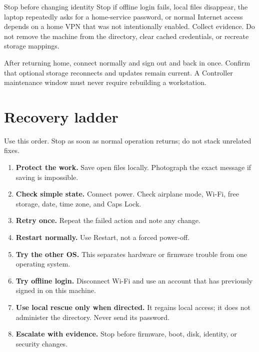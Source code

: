 
\begin{gate}{Stop before changing identity}
Stop if offline login fails, local files disappear, the laptop repeatedly
asks for a home-service password, or normal Internet access depends on a home
VPN that was not intentionally enabled. Collect evidence. Do not remove the
machine from the directory, clear cached credentials, or recreate storage
mappings.
\end{gate}

After returning home, connect normally and sign out and back in once. Confirm
that optional storage reconnects and updates remain current. A Controller
maintenance window must never require rebuilding a workstation.

\section{Recovery ladder}

Use this order. Stop as soon as normal operation returns; do not stack
unrelated fixes.

\begin{enumerate}
\item \textbf{Protect the work.} Save open files locally. Photograph the exact
message if saving is impossible.
\item \textbf{Check simple state.} Connect power. Check airplane mode, Wi-Fi,
free storage, date, time zone, and Caps Lock.
\item \textbf{Retry once.} Repeat the failed action and note any change.
\item \textbf{Restart normally.} Use Restart, not a forced power-off.
\item \textbf{Try the other OS.} This separates hardware or firmware trouble
from one operating system.
\item \textbf{Try offline login.} Disconnect Wi-Fi and use an account that has
previously signed in on this machine.
\item \textbf{Use local rescue only when directed.} It regains local access;
it does not administer the directory. Never send its password.
\item \textbf{Escalate with evidence.} Stop before firmware, boot, disk,
identity, or security changes.
\end{enumerate}

